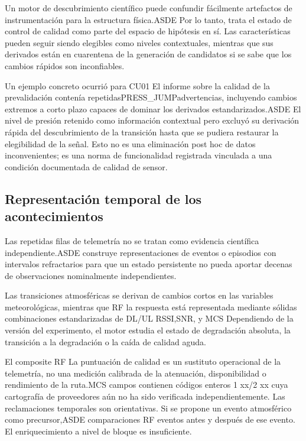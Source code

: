 \documentclass{ieeeaccess}
\begin{document}
Un motor de descubrimiento científico puede confundir fácilmente artefactos de instrumentación para la estructura física.ASDE Por lo tanto, trata el estado de control de calidad como parte del espacio de hipótesis en sí. Las características pueden seguir siendo elegibles como niveles contextuales, mientras que sus derivados están en cuarentena de la generación de candidatos si se sabe que los cambios rápidos son inconfiables.

Un ejemplo concreto ocurrió para CU01 El informe sobre la calidad de la prevalidación contenía repetidasPRESS\_\allowbreak JUMPadvertencias, incluyendo cambios extremos a corto plazo capaces de dominar los derivados estandarizados.ASDE El nivel de presión retenido como información contextual pero excluyó su derivación rápida del descubrimiento de la transición hasta que se pudiera restaurar la elegibilidad de la señal. Esto no es una eliminación post hoc de datos inconvenientes; es una norma de funcionalidad registrada vinculada a una condición documentada de calidad de sensor.

\subsection{Representación temporal de los acontecimientos}\label{representaciuxf3n-temporal-de-los-acontecimientos}

Las repetidas filas de telemetría no se tratan como evidencia científica independiente.ASDE construye representaciones de eventos o episodios con intervalos refractarios para que un estado persistente no pueda aportar decenas de observaciones nominalmente independientes.

Las transiciones atmosféricas se derivan de cambios cortos en las variables meteorológicas, mientras que RF la respuesta está representada mediante sólidas combinaciones estandarizadas de DL/UL RSSI,SNR, y MCS Dependiendo de la versión del experimento, el motor estudia el estado de degradación absoluta, la transición a la degradación o la caída de calidad aguda.

El composite RF La puntuación de calidad es un sustituto operacional de la telemetría, no una medición calibrada de la atenuación, disponibilidad o rendimiento de la ruta.MCS campos contienen códigos enteros 1 xx/2 xx cuya cartografía de proveedores aún no ha sido verificada independientemente. Las reclamaciones temporales son orientativas. Si se propone un evento atmosférico como precursor,ASDE comparaciones RF eventos antes y después de ese evento. El enriquecimiento a nivel de bloque es insuficiente.
\end{document}
